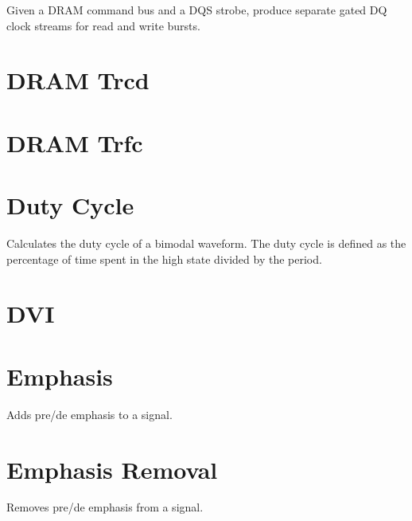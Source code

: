 Given a DRAM command bus and a DQS strobe, produce separate gated DQ clock streams for read and write bursts.

\pagebreak
\section{DRAM Trcd}

\pagebreak
\section{DRAM Trfc}

\pagebreak
\section{Duty Cycle}

Calculates the duty cycle of a bimodal waveform. The duty cycle is defined as the percentage of time spent in the high
state divided by the period.

\pagebreak
\section{DVI}
\label{filter:dvi}

\pagebreak
\section{Emphasis}

Adds pre/de emphasis to a signal.

\pagebreak
\section{Emphasis Removal}

Removes pre/de emphasis from a signal.

